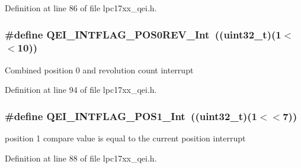 \-Definition at line 86 of file lpc17xx\-\_\-qei.\-h.

\hypertarget{group___q_e_i___public___macros_gaf54b874e333c1615fdf0271dd5233502}{
\subsubsection[{\-Q\-E\-I\-\_\-\-I\-N\-T\-F\-L\-A\-G\-\_\-\-P\-O\-S0\-R\-E\-V\-\_\-\-Int}]{\setlength{\rightskip}{0pt plus 5cm}\#define {\bf \-Q\-E\-I\-\_\-\-I\-N\-T\-F\-L\-A\-G\-\_\-\-P\-O\-S0\-R\-E\-V\-\_\-\-Int}~((uint32\-\_\-t)(1$<$$<$10))}}\label{group___q_e_i___public___macros_gaf54b874e333c1615fdf0271dd5233502}
\-Combined position 0 and revolution count interrupt 

\-Definition at line 94 of file lpc17xx\-\_\-qei.\-h.

\hypertarget{group___q_e_i___public___macros_gaf7cffa6d370fe451abd2b87c35296d07}{
\subsubsection[{\-Q\-E\-I\-\_\-\-I\-N\-T\-F\-L\-A\-G\-\_\-\-P\-O\-S1\-\_\-\-Int}]{\setlength{\rightskip}{0pt plus 5cm}\#define {\bf \-Q\-E\-I\-\_\-\-I\-N\-T\-F\-L\-A\-G\-\_\-\-P\-O\-S1\-\_\-\-Int}~((uint32\-\_\-t)(1$<$$<$7))}}\label{group___q_e_i___public___macros_gaf7cffa6d370fe451abd2b87c35296d07}
position 1 compare value is equal to the current position interrupt 

\-Definition at line 88 of file lpc17xx\-\_\-qei.\-h.

